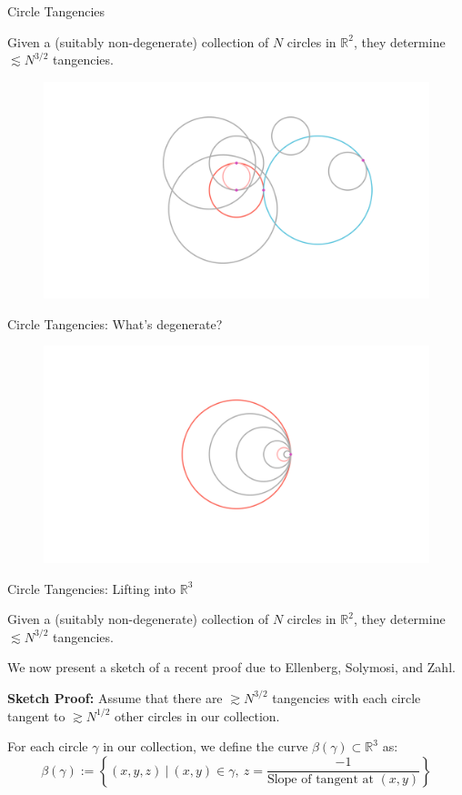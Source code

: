 \documentclass{beamer}
\newcommand{\RR}{\mathbb R}
\newcommand{\nfr}[1]{\begin{frame} #1
\end{frame}}
\begin{document}
\nfr{{Circle Tangencies}
\begin{theorem}
    Given a (suitably non-degenerate) collection of $N$ circles in $\RR^2$, they determine $\lesssim N^{3/2}$ tangencies.
\end{theorem}
    \begin{figure}[h]
        \centering
        \includegraphics[trim={5cm 0 4cm 2cm}, clip,width=0.8
        \textwidth]{images/Diagram1.png}

    \end{figure}
}

\nfr{{Circle Tangencies: What's degenerate?}
\begin{figure}[h]
    \centering
    \includegraphics[width=1
    \textwidth, trim={5cm 0 4cm 2cm}, clip=true]{images/Diagram2.png}
\end{figure}
}


\nfr{{Circle Tangencies: Lifting into $\RR^3$}
\begin{theorem}
    Given a (suitably non-degenerate) collection of $N$ circles in $\RR^2$, they determine $\lesssim N^{3/2}$ tangencies.
\end{theorem}
We now present a sketch of a recent proof due to Ellenberg, Solymosi, and Zahl. \cite{ellenberg2016new}

\textbf{Sketch Proof:}
Assume that there are $\gtrsim N^{3/2}$ tangencies with each circle tangent to $\gtrsim N^{1/2}$ other circles in our collection.

For each circle $\gamma$ in our collection, we define the curve $\beta(\gamma) \subset \RR^3$ as: \[\beta(\gamma) := \left\{(x,y,z) \ | \ (x,y) \in \gamma,\ z = \frac{-1}{\text{Slope of tangent at }(x,y)} \right\}
\]


}
\end{document}
